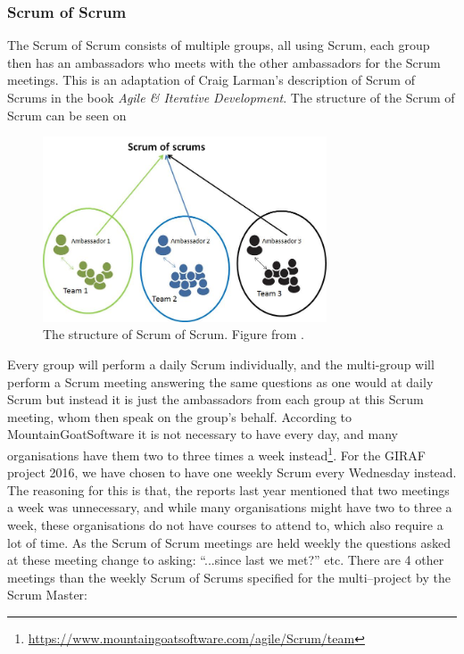 \subsubsection{Scrum of Scrum}
The Scrum of Scrum consists of multiple groups, all using Scrum, each group then has an ambassadors who meets with the other ambassadors for the Scrum meetings.
This is an adaptation of Craig Larman's description of Scrum of Scrums in the book \textit{Agile \& Iterative Development}\cite{ScrumBOOK}.
The structure of the Scrum of Scrum can be seen on 

\begin{figure}[!htb]
\centering
\includegraphics[width=0.75\textwidth]{figures/ScrumofScrum.png}
\caption{The structure of Scrum of Scrum. Figure from \cite{ScrumofScrumfigure}.}
\label{fig:ScrumofScrum}
\end{figure}

Every group will perform a daily Scrum individually, and the multi-group will perform a Scrum meeting answering the same questions as one would at daily Scrum but instead it is just the ambassadors from each group at this Scrum meeting, whom then speak on the group's behalf.
According to MountainGoatSoftware it is not necessary to have every day, and many organisations have them two to three times a week instead\footnote{\url{https://www.mountaingoatsoftware.com/agile/Scrum/team}}.
For the GIRAF project 2016, we have chosen to have one weekly Scrum every Wednesday instead.
The reasoning for this is that, the reports last year mentioned that two meetings a week was unnecessary, and while many organisations might have two to three a week, these organisations do not have courses to attend to, which also require a lot of time.
As the Scrum of Scrum meetings are held weekly the questions asked at these meeting change to asking: \enquote{...since last we met?} etc.
There are 4 other meetings than the weekly Scrum of Scrums specified for the multi--project by the Scrum Master:

